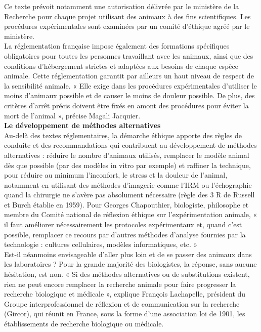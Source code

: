 \documentclass[8pt]{article}
\begin{document}
Ce texte prévoit notamment une autorisation délivrée par le ministère de la Recherche pour chaque projet utilisant des animaux à des fins scientifiques. Les procédures expérimentales sont examinées par un comité d’éthique agréé par le ministère.\\

La réglementation française impose également des formations spécifiques obligatoires pour toutes les personnes travaillant avec les animaux, ainsi que des conditions d’hébergement strictes et adaptées aux besoins de chaque espèce animale. Cette réglementation garantit par ailleurs un haut niveau de respect de la sensibilité animale. « Elle exige dans les procédures expérimentales d’utiliser le moins d’animaux possible et de causer le moins de douleur possible. De plus, des critères d’arrêt précis doivent être fixés en amont des procédures pour éviter la mort de l’animal », précise Magali Jacquier.\\

\textbf{Le développement de méthodes alternatives}\\

Au-delà des textes réglementaires, la démarche éthique apporte des règles de conduite et des recommandations qui contribuent au développement de méthodes alternatives : réduire le nombre d’animaux utilisés, remplacer le modèle animal dès que possible (par des modèles in vitro par exemple) et raffiner la technique, pour réduire au minimum l’inconfort, le stress et la douleur de l’animal, notamment en utilisant des méthodes d’imagerie comme l’IRM ou l’échographie quand la chirurgie ne s’avère pas absolument nécessaire (règle des 3 R de Russell et Burch établie en 1959). Pour Georges Chapouthier, biologiste, philosophe et membre du Comité national de réflexion éthique sur l’expérimentation animale, « il faut améliorer nécessairement les protocoles expérimentaux et, quand c’est possible, remplacer ce recours par d’autres méthodes d’analyse fournies par la technologie : cultures cellulaires, modèles informatiques, etc. »\\


Est-il néanmoins envisageable d’aller plus loin et de se passer des animaux dans les laboratoires ? Pour la grande majorité des biologistes, la réponse, sans aucune hésitation, est non. « Si des méthodes alternatives ou de substitutions existent, rien ne peut encore remplacer la recherche animale pour faire progresser la recherche biologique et médicale », explique François Lachapelle, président du Groupe interprofessionnel de réflexion et de communication sur la recherche (Gircor), qui réunit en France, sous la forme d’une association loi de 1901, les établissements de recherche biologique ou médicale.\\
\end{document}
